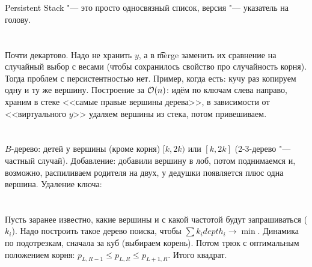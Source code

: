 \section{} %
Persistent Stack "--- это просто односвязный список, версия "--- указатель на голову.
\TODO

\section{} %
Почти декартово.
Надо не хранить $y$, а в \t{merge} заменить их сравнение на случайный выбор с весами
(чтобы сохранилось свойство про случайность корня).
Тогда проблем с персистентностью нет.
Пример, когда есть: кучу раз копируем одну и ту же вершину.
Построение за $\mathcal{O}(n)$: идём по ключам слева направо, храним в стеке <<самые правые вершины дерева>>,
в зависимости от <<виртуального $y$>> удаляем вершины из стека, потом привешиваем.

\section{} %
$B$-дерево: детей у вершины (кроме корня) $[k, 2k)$ или $[k,2k]$ (2-3-дерево "--- частный случай).
Добавление: добавили вершину в лоб, потом поднимаемся и, возможно, распиливаем родителя на двух,
у дедушки появляется плюс одна вершина.
Удаление ключа: \TODO

\section{} %
Пусть заранее известно, какие вершины и с какой частотой будут запрашиваться ($k_i$).
Надо построить такое дерево поиска, чтобы $\sum k_i depth_i \to \min$.
Динамика по подотрезкам, сначала за куб (выбираем корень).
Потом трюк с оптимальным положением корня: $p_{L,R-1} \le p_{L,R} \le p_{L+1,R}$.
Итого квадрат.
